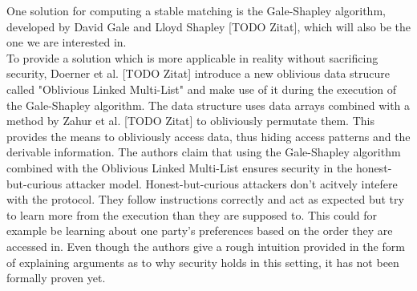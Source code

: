 One solution for computing a stable matching is the Gale-Shapley algorithm, developed by David Gale and Lloyd Shapley [TODO Zitat], which will also be the one we are interested in. \\
To provide a solution which is more applicable in reality without sacrificing security, Doerner et al. [TODO Zitat] introduce a new oblivious data strucure called "Oblivious Linked Multi-List" and make use of it during the execution of the Gale-Shapley algorithm. The data structure uses data arrays combined with a method by Zahur et al. [TODO Zitat] to obliviously permutate them. This provides the means to obliviously access data, thus hiding access patterns and the derivable information. The authors claim that using the Gale-Shapley algorithm combined with the Oblivious Linked Multi-List ensures security in the honest-but-curious attacker model. Honest-but-curious attackers don't acitvely intefere with the protocol. They follow instructions correctly and act as expected but try to learn more from the execution than they are supposed to. This could for example be learning about one party's preferences based on the order they are accessed in. Even though the authors give a rough intuition provided in the form of explaining arguments as to why security holds in this setting, it has not been formally proven yet.
